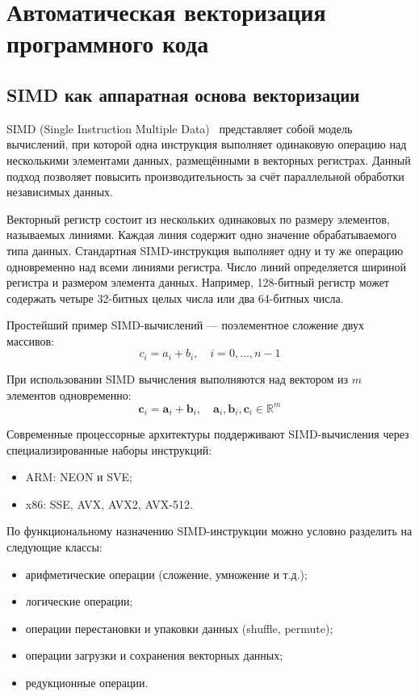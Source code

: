 \section{Автоматическая векторизация программного кода}
\label{sec:Chapter2} 

\subsection{SIMD как аппаратная основа векторизации}

SIMD (Single Instruction Multiple Data)~\cite{flynn1972some} представляет собой модель вычислений, 
при которой одна инструкция выполняет одинаковую операцию над несколькими элементами данных, 
размещёнными в векторных регистрах. 
Данный подход позволяет повысить производительность за счёт параллельной обработки независимых данных.

Векторный регистр состоит из нескольких одинаковых по размеру элементов, называемых линиями. 
Каждая линия содержит одно значение обрабатываемого типа данных. 
Стандартная SIMD-инструкция выполняет одну и ту же операцию одновременно над всеми линиями регистра. 
Число линий определяется шириной регистра и размером элемента данных. 
Например, 128-битный регистр может содержать четыре 32-битных целых числа или два 64-битных числа.

Простейший пример SIMD-вычислений — поэлементное сложение двух массивов:
\[
c_i = a_i + b_i,\quad i = 0,\dots,n-1
\]

При использовании SIMD вычисления выполняются над вектором из \(m\) элементов одновременно:
\[
\mathbf{c}_i = \mathbf{a}_i + \mathbf{b}_i,\quad \mathbf{a}_i, \mathbf{b}_i, \mathbf{c}_i \in \mathbb{R}^m
\]

Современные процессорные архитектуры поддерживают SIMD-вычисления через специализированные наборы инструкций:
\begin{itemize}
    \item ARM: NEON и SVE;
    \item x86: SSE, AVX, AVX2, AVX-512.
\end{itemize}

По функциональному назначению SIMD-инструкции можно условно разделить на следующие классы:
\begin{itemize}
    \item арифметические операции (сложение, умножение и т.д.);
    \item логические операции;
    \item операции перестановки и упаковки данных (shuffle, permute);
    \item операции загрузки и сохранения векторных данных;
    \item редукционные операции.
\end{itemize}


